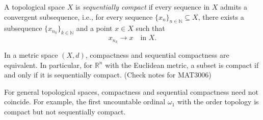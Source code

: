\begin{definition}\label{def:sequential_compact}
A topological space \(X\) is \emph{sequentially compact} if every sequence in \(X\) admits a convergent subsequence, i.e., for every sequence \(\{x_n\}_{n \in \mathbb{N}} \subseteq X\), there exists a subsequence \(\{x_{n_k}\}_{k \in \mathbb{N}}\) and a point \(x \in X\) such that 
\[
x_{n_k} \to x \quad \text{in } X.
\]
\end{definition}

In a metric space \((X,d)\), compactness and sequential compactness are equivalent.  
In particular, for \(\mathbb{R}^n\) with the Euclidean metric, a subset is compact 
if and only if it is sequentially compact. (Check notes for MAT3006)

\begin{remark}
For general topological spaces, compactness and sequential compactness need not coincide.  
For example, the first uncountable ordinal \(\omega_1\) with the order topology is compact but not sequentially compact.
\end{remark}